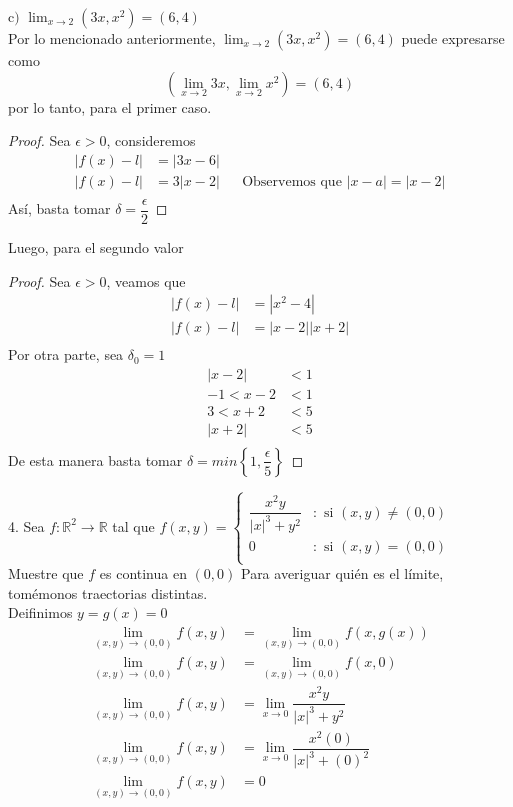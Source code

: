 \documentclass[letterpaper]{article}
\providecommand{\abs}[1]{\left|#1\right|}
\renewcommand{\*}{\cdot}
\theoremstyle{definition}
\begin{document}
\noindent$\text{c) }\displaystyle\lim_{x \to 2} (3x , x^2) = (6,4) $\\[0.5cm]
Por lo mencionado anteriormente,  $ \lim_{x \to 2} (3x , x^2) = (6,4) $ puede expresarse como 
\[  (\lim_{x \to 2} 3x , \lim_{x \to 2}x^2) = (6,4)\]
por lo tanto, para el primer caso.\\
\begin{proof}
	Sea $ \epsilon > 0 $, consideremos 
	\begin{align*}
		\abs{f(x) - l} &= \abs{3x - 6}\\
		\abs{f(x) - l} &= 3\abs{x - 2} && \text{Observemos que } \abs{x - a} = \abs{x - 2}\\
	\end{align*}
	Así, basta tomar $ \delta = \dfrac{\epsilon}{2} $
\end{proof}
Luego, para el segundo valor
\begin{proof}
	Sea $ \epsilon > 0 $, veamos que
	\begin{align*}
		\abs{f(x) - l} &= \abs{x^2 - 4}\\
		\abs{f(x) - l} &= \abs{x - 2}\abs{x + 2}\\
	\end{align*}
	Por otra parte, sea $ \delta_0 = 1 $
	\begin{align*}
		\abs{x -2} &< 1\\
		-1< x -2 &< 1\\
		3< x +2 &< 5\\
		\abs{x+2} &< 5\\
	\end{align*}
	De esta manera basta tomar $ \delta = min \left\lbrace 1, \dfrac{\epsilon}{5}\right\rbrace $
\end{proof}
4.  Sea $f: \mathbb{R}^2  \longrightarrow \mathbb{R}$ tal que $f(x,y) = \left\{
     \begin{array}{cl}
       \dfrac{x^2y}{\vert x \vert^3 + y^2} & : \text{ si } (x,y) \neq (0,0)\\
       0 & : \text{ si } (x,y) = (0,0)\\
     \end{array}
   \right.$ \\Muestre que $f$ es continua en $(0,0)$
Para averiguar quién es el límite, tomémonos traectorias distintas. \\
Deifinimos $ y = g(x) = 0 $
\begin{align*}
	\lim\limits_{(x,y)\to (0,0)} f(x,y) &= \lim\limits_{(x,y) \to (0,0)} f(x,g(x))\\
	\lim\limits_{(x,y)\to (0,0)} f(x,y) &= \lim\limits_{(x,y) \to (0,0)} f(x,0)\\
	\lim\limits_{(x,y)\to (0,0)} f(x,y) &= \lim\limits_{x \to 0} \dfrac{x^2y}{\vert x \vert^3 + y^2} \\
	\lim\limits_{(x,y)\to (0,0)} f(x,y) &= \lim\limits_{x \to 0} \dfrac{x^2(0)}{\vert x \vert^3 + (0)^2} \\
	\lim\limits_{(x,y)\to (0,0)} f(x,y) &= 0
\end{align*}
\end{document}
